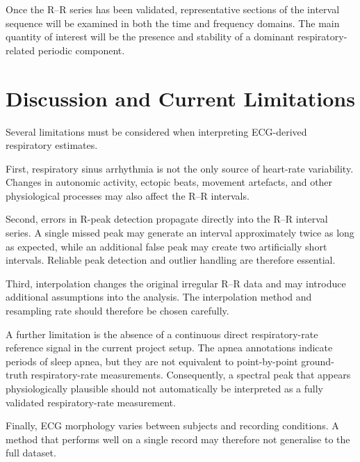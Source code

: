 Once the R--R series has been validated, representative sections of the
interval sequence will be examined in both the time and frequency domains.
The main quantity of interest will be the presence and stability of a
dominant respiratory-related periodic component.

%


\section{Discussion and Current Limitations}
\label{sec:discussion}

Several limitations must be considered when interpreting ECG-derived
respiratory estimates.

First, respiratory sinus arrhythmia is not the only source of heart-rate
variability. Changes in autonomic activity, ectopic beats, movement
artefacts, and other physiological processes may also affect the R--R
intervals.

Second, errors in R-peak detection propagate directly into the R--R interval
series. A single missed peak may generate an interval approximately twice as
long as expected, while an additional false peak may create two artificially
short intervals. Reliable peak detection and outlier handling are therefore
essential.

Third, interpolation changes the original irregular R--R data and may
introduce additional assumptions into the analysis. The interpolation method
and resampling rate should therefore be chosen carefully.

A further limitation is the absence of a continuous direct respiratory-rate
reference signal in the current project setup. The apnea annotations indicate
periods of sleep apnea, but they are not equivalent to point-by-point
ground-truth respiratory-rate measurements. Consequently, a spectral peak
that appears physiologically plausible should not automatically be interpreted
as a fully validated respiratory-rate measurement.

Finally, ECG morphology varies between subjects and recording conditions.
A method that performs well on a single record may therefore not generalise
to the full dataset.


